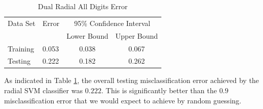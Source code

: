 \documentclass{article}
\begin{document}
\begin{table}\label{tablefull}
\caption{Dual Radial All Digits Error}
\begin{center}
\begin{tabular}{llcc}
\toprule
Data Set & Error & \multicolumn{2}{c}{95\% Confidence Interval} \\
\cmidrule(r){3-4}
& & Lower Bound & Upper Bound \\
\midrule
Training & 0.053 & 0.038 & 0.067 \\
Testing & 0.222 & 0.182 & 0.262 \\
\bottomrule
\end{tabular}
\end{center}
\end{table}

As indicated in Table \ref{tablefull}, the overall testing misclassification error achieved by the radial SVM classifier was \(0.222\). This is significantly better than the \(0.9\) misclassification error that we would expect to achieve by random guessing.
\end{document}
